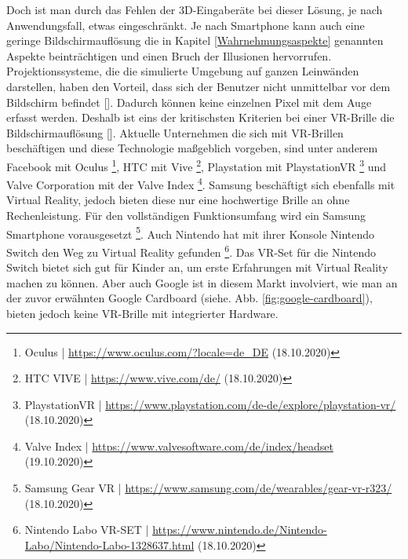 \documentclass[a4paper,12pt,oneside]{article}
\begin{document}
        Doch ist man durch das Fehlen der 3D-Eingaberäte bei dieser Lösung, je
        nach Anwendungsfall, etwas eingeschränkt. Je nach Smartphone kann auch eine geringe
        Bildschirmauflösung die in Kapitel \ref{Wahrnehmungsaspekte} genannten Aspekte
        beinträchtigen und einen Bruch der Illusionen hervorrufen.
        Projektionssysteme, die die simulierte Umgebung auf ganzen Leinwänden darstellen,
        haben den Vorteil, dass sich der Benutzer nicht unmittelbar vor dem Bildschirm
        befindet [\cite[134]{Dorner2019}]. Dadurch können keine einzelnen Pixel mit dem Auge 
        erfasst werden. Deshalb ist eins der kritischsten Kriterien bei einer VR-Brille 
        die Bildschirmauflösung [\cite[134]{Dorner2019}].
        Aktuelle Unternehmen die sich mit VR-Brillen beschäftigen und diese Technologie
        maßgeblich vorgeben, sind unter anderem  Facebook mit Oculus
        \footnote{Oculus | \url{https://www.oculus.com/?locale=de_DE} (18.10.2020)}, 
        HTC mit Vive \footnote{HTC VIVE | \url{https://www.vive.com/de/} (18.10.2020)},
        Playstation mit PlaystationVR
        \footnote{PlaystationVR | \url{https://www.playstation.com/de-de/explore/playstation-vr/} (18.10.2020)}
        und Valve Corporation mit der Valve Index
        \footnote{Valve Index | \url{https://www.valvesoftware.com/de/index/headset} (19.10.2020)}.
        Samsung beschäftigt sich ebenfalls mit Virtual
        Reality, jedoch bieten diese nur eine hochwertige Brille an ohne Rechenleistung.
        Für den vollständigen Funktionsumfang wird ein Samsung Smartphone vorausgesetzt
        \footnote{Samsung Gear VR | \url{https://www.samsung.com/de/wearables/gear-vr-r323/} (18.10.2020)}.
        Auch Nintendo hat mit ihrer Konsole Nintendo Switch den Weg zu Virtual Reality
        gefunden
        \footnote{Nintendo Labo VR-SET | \url{https://www.nintendo.de/Nintendo-Labo/Nintendo-Labo-1328637.html} (18.10.2020)}.
        Das VR-Set für die Nintendo Switch bietet sich gut für Kinder an, um erste 
        Erfahrungen mit Virtual Reality machen zu können.
        Aber auch Google ist in diesem Markt involviert, wie man an der zuvor erwähnten
        Google Cardboard (siehe. Abb. \ref{fig:google-cardboard}), bieten jedoch keine 
        VR-Brille mit integrierter Hardware.
\end{document}
